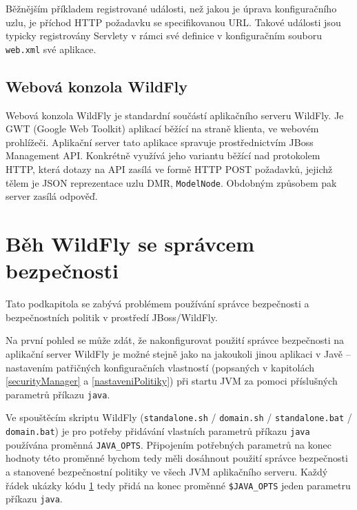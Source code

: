 Běžnějším příkladem registrované události, než jakou je úprava konfiguračního uzlu, je příchod HTTP požadavku se specifikovanou URL.
Takové události jsou typicky registrovány Servlety v rámci své definice v konfiguračním souboru {\tt web.xml} své aplikace.
\cite{jboss7slideShare}

\subsection{Webová konzola WildFly} \label{hal}

Webová konzola WildFly je standardní součástí aplikačního serveru WildFly.
Je GWT (Google Web Toolkit) aplikací běžící na straně klienta, ve webovém prohlížeči.
Aplikační server tato aplikace spravuje prostřednictvím JBoss Management API.
Konkrétně využívá jeho variantu běžící nad protokolem HTTP, která dotazy na API zasílá ve formě HTTP POST požadavků, jejichž tělem je JSON reprezentace uzlu DMR, {\tt ModelNode}. Obdobným způsobem pak server zasílá odpověď.
\cite{WildFlyManagementAPIreference}

\section{Běh WildFly se správcem bezpečnosti} \label{wildflySeSM}

Tato podkapitola se zabývá problémem používání správce bezpečnosti a bezpečnostních politik v prostředí JBoss/WildFly.

Na první pohled se může zdát, že nakonfigurovat použití správce bezpečnosti na aplikační server WildFly je možné stejně jako na jakoukoli jinou aplikaci v Javě -- nastavením patřičných konfiguračních vlastností (popsaných v kapitolách \ref{securityManager} a \ref{nastaveniPolitiky}) při startu JVM za pomoci příslušných parametrů příkazu {\tt java}.

Ve spouštěcím skriptu WildFly ({\tt standalone.sh} / {\tt domain.sh} / {\tt standalone.bat} / {\tt domain.bat}) je pro potřeby přidávání vlastních parametrů příkazu {\tt java} používána proměnná {\tt JAVA\_OPTS}.
Připojením potřebných parametrů na konec hodnoty této proměnné bychom tedy měli dosáhnout použití správce bezpečnosti a stanovené bezpečnostní politiky ve všech JVM aplikačního serveru. Každý řádek ukázky kódu \ref{wildflySeSM} tedy přidá na konec proměnné {\tt \$JAVA\_OPTS} jeden parametru příkazu {\tt java}. \cite{jbossSecurityManager}

